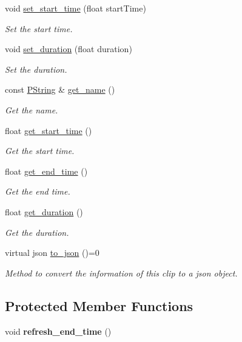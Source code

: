 \begin{DoxyCompactItemize}
void \mbox{\hyperlink{classprz_1_1_clip_a7cbb55c3a344ab273d655f3b1e3fe5d1}{set\+\_\+start\+\_\+time}} (float start\+Time)
\begin{DoxyCompactList}\small\item\em Set the start time. \end{DoxyCompactList}\item 
void \mbox{\hyperlink{classprz_1_1_clip_a7555fe34e45f6032ea282ca6d605ace6}{set\+\_\+duration}} (float duration)
\begin{DoxyCompactList}\small\item\em Set the duration. \end{DoxyCompactList}\item 
const \mbox{\hyperlink{classprz_1_1_p_string}{P\+String}} \& \mbox{\hyperlink{classprz_1_1_clip_accaf42d7a82d41ad70032870981f8d83}{get\+\_\+name}} ()
\begin{DoxyCompactList}\small\item\em Get the name. \end{DoxyCompactList}\item 
float \mbox{\hyperlink{classprz_1_1_clip_a65df9388088c8a607e90b73506550cd5}{get\+\_\+start\+\_\+time}} ()
\begin{DoxyCompactList}\small\item\em Get the start time. \end{DoxyCompactList}\item 
float \mbox{\hyperlink{classprz_1_1_clip_acfe08e188c11afa8ca32b334907fe9f9}{get\+\_\+end\+\_\+time}} ()
\begin{DoxyCompactList}\small\item\em Get the end time. \end{DoxyCompactList}\item 
float \mbox{\hyperlink{classprz_1_1_clip_a6e870ff68a0f4ff4759007ddb4853f03}{get\+\_\+duration}} ()
\begin{DoxyCompactList}\small\item\em Get the duration. \end{DoxyCompactList}\item 
virtual json \mbox{\hyperlink{classprz_1_1_clip_a4959ada0fab0fbac6cb5239578ac3ec6}{to\+\_\+json}} ()=0
\begin{DoxyCompactList}\small\item\em Method to convert the information of this clip to a json object. \end{DoxyCompactList}\end{DoxyCompactItemize}
\subsection*{Protected Member Functions}
\begin{DoxyCompactItemize}
\item 
\mbox{\label{classprz_1_1_clip_a2b970808e50b0003a638c78ba6d26200}} 
void {\bfseries refresh\+\_\+end\+\_\+time} ()
\end{DoxyCompactItemize}
